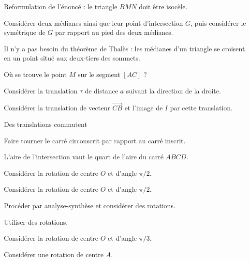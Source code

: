 \begin{Hint}{45}
Reformulation de l'énoncé : le triangle $BMN$ doit être isocèle.
\end{Hint}
\begin{Hint}{47}
Considérer deux médianes ainsi que leur point d'intersection $G$, puis considérer le symétrique de $G$ par rapport au pied des deux médianes.
\end{Hint}
\begin{Hint}{49}
Il n'y a pas besoin du théorème de Thalès  : les médianes d'un triangle se croisent en un point situé aux deux-tiers des sommets.
\end{Hint}
\begin{Hint}{51}
Où se trouve le point $M$ sur le segment $[AC]$ ?
\end{Hint}
\begin{Hint}{54}
Considérer la translation $\tau$ de distance $a$ suivant la direction de la droite.
\end{Hint}
\begin{Hint}{55}
Considérer la translation de vecteur $\overrightarrow{CB}$ et l'image de $I$ par cette translation.
\end{Hint}
\begin{Hint}{56}
Des translations  commutent
\end{Hint}
\begin{Hint}{57}
Faire tourner le carré circonscrit par rapport au carré inscrit.
\end{Hint}
\begin{Hint}{58}
L'aire de l'intersection vaut le quart de l'aire du carré $ABCD$.
\end{Hint}
\begin{Hint}{59}
Considérer la rotation de centre $O$ et d'angle $\pi/2$.
\end{Hint}
\begin{Hint}{60}
Considérer la rotation de centre $O$ et d'angle $\pi/2$.
\end{Hint}
\begin{Hint}{61}
Procéder par analyse-synthèse et considérer des rotations.
\end{Hint}
\begin{Hint}{62}
Utiliser des rotations.
\end{Hint}
\begin{Hint}{64}
Considérer la rotation de centre $O$ et d'angle $\pi/3$.
\end{Hint}
\begin{Hint}{65}
Considérer  une rotation de centre $A$.
\end{Hint}
